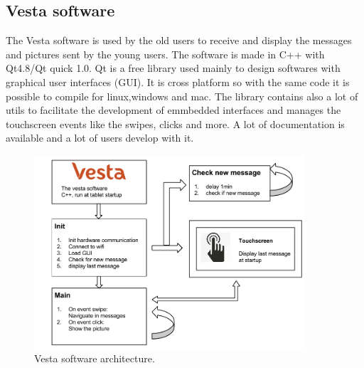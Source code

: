 \subsection{Vesta software}
The Vesta software is used by the old users to receive and display the messages and pictures sent by the young users.
The software is made in C++ with Qt4.8/Qt quick 1.0. Qt is a free library used mainly to design softwares with graphical user interfaces (GUI). It is cross platform so with the same code it is possible to compile for linux,windows and mac.
The library contains also a lot of utils to facilitate the development of emmbedded interfaces and manages the touchscreen events like the swipes, clicks and more. A lot of documentation is available and a lot of users develop with it.
\begin{figure}[!htb]
    \centering
    \includegraphics[width=0.9\textwidth,keepaspectratio]{chap/softFig/vesta_software_diagram2}
    \caption{Vesta software architecture.}
    \label{fig:soft archi}
\end{figure}